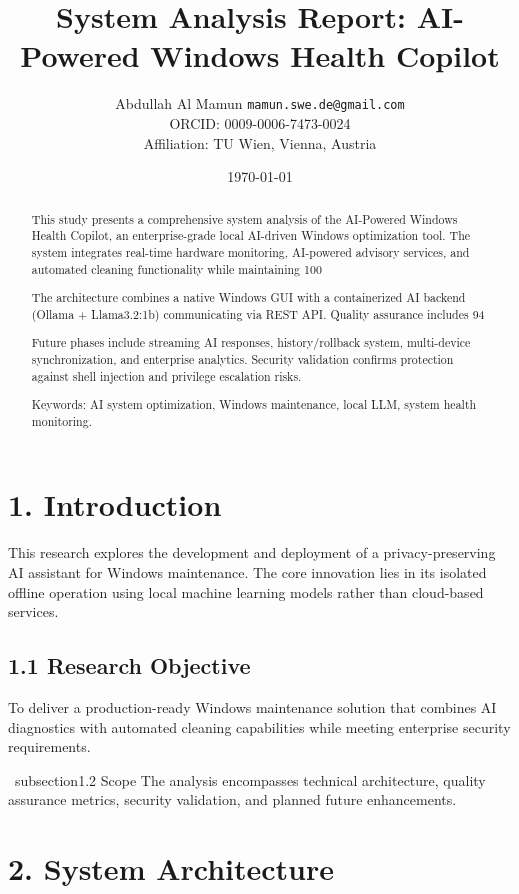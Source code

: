 \documentclass[12pt]{article}
\title{System Analysis Report: AI-Powered Windows Health Copilot}
\author{Abdullah Al Mamun \texttt{mamun.swe.de@gmail.com} \\
ORCID: 0009-0006-7473-0024 \\
Affiliation: TU Wien, Vienna, Austria}
\date{\today}
\begin{document}
\maketitle

\begin{abstract}
This study presents a comprehensive system analysis of the AI-Powered Windows Health Copilot, an enterprise-grade local AI-driven Windows optimization tool. The system integrates real-time hardware monitoring, AI-powered advisory services, and automated cleaning functionality while maintaining 100%

The architecture combines a native Windows GUI with a containerized AI backend (Ollama + Llama3.2:1b) communicating via REST API. Quality assurance includes 94%

Future phases include streaming AI responses, history/rollback system, multi-device synchronization, and enterprise analytics. Security validation confirms protection against shell injection and privilege escalation risks.

Keywords: AI system optimization, Windows maintenance, local LLM, system health monitoring.
\end{abstract}


\section{1. Introduction}
This research explores the development and deployment of a privacy-preserving AI assistant for Windows maintenance. The core innovation lies in its isolated offline operation using local machine learning models rather than cloud-based services. 

\subsection{1.1 Research Objective}
To deliver a production-ready Windows maintenance solution that combines AI diagnostics with automated cleaning capabilities while meeting enterprise security requirements. 

\ subsection{1.2 Scope}
The analysis encompasses technical architecture, quality assurance metrics, security validation, and planned future enhancements.

\section{2. System Architecture}
\end{document}

